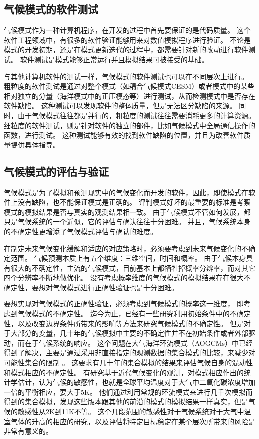 \subsection{气候模式的软件测试}
\label{related:softVerify}
气候模式作为一种计算机程序，在开发的过程中首先要保证的是代码质量。
这个软件工程领域中，有很多的软件验证能够用来对数值模拟程序进行验证\cite{whitner1989guidelines}。
不论是模式的开发初期，还是在模式更新迭代的过程中，都需要针对新的改动进行软件测试。
软件测试是模式能够正常运行并且模拟结果可被接受的基础\cite{oreskes1994verification,clune2011,easterbrook2011}。


与其他计算机软件的测试一样，气候模式的软件测试也可以在不同层次上进行。 
粗粒度的软件测试是通过对整个模式（如耦合气候模式CESM）或者模式中的某些相对独立的分量（海洋模式中的正压模态等）进行测试，从而检测模式中是否存在软件缺陷。
这种测试可以发现软件的整体质量，但是无法区分缺陷的来源。
同时，由于气候模式往往都是并行的，粗粒度的测试往往需要消耗更多的计算资源\cite{clune2011}。
细粒度的软件测试，则是针对软件的独立的部件，比如气候模式中全局通信操作的函数，进行测试。
这种测试能够有效的找到软件缺陷的位置，并且为改善软件质量提供具体指导。



\subsection{气候模式的评估与验证}
\label{related:climateValidation}

气候模式是为了模拟和预测现实中的气候变化而开发的软件，因此，即使模式在软件上没有缺陷，也不能保证模式是正确的。 
评判模式好坏的最重要的标准是考察模式的模拟结果是否与真实的观测结果相一致。
由于气候模式不管如何发展，都只是气候系统的一个近似，它的评估与确认往往十分困难\cite{martis2006validation}。
并且，气候系统本身的不确定性更增添了气候模式评估与确认的难度。 

在制定未来气候变化缓解和适应的对应策略时，必须要考虑到未来气候变化的不确定范围。
气候预测本质上有五个维度：三维空间，时间和概率。 
由于气候本身具有很大的不确定性，主流的气候模式，目前基本上都牺牲掉概率分辨率，而对其它四个分辨率不断地做优化。
没有考虑概率维度的气候模式的模拟结果存在很大不确定性，要想对气候模式进行正确性验证也是十分困难\cite{whitner1989guidelines}。


要想实现对气候模式的正确性验证，必须考虑到气候模式的概率这一维度， 即考虑到气候模式的不确定性。 
迄今为止，已经有一些研究利用初始条件中的不确定性，以及改变边界条件所带来的影响等方法来研究气候模式的不确定性。
但是对于大部分的变量，几十年的气候模拟中主要的不确定性并不在初始条件或者外部驱动，而在于气候系统的响应。
这个问题在大气海洋环流模式（AOGCMs）中已经得到了解决，主要是通过采用非直接指定的观测数据的集合模式的比较，来减少对可能性集合的限制\cite{allen2002towards} 。 
这要求有几十年的集合模拟的结果来评估气候自身的混动性和模式相应的不确定性。 
有研究基于近代气候变化的观测，对模式相应作出的统计学估计，认为气候的敏感性，也就是全球平均温度对于大气中二氧化碳浓度增加一倍的平衡相应，要大于5K\cite{stainforth2005uncertainty}。
他们通过利用常规的环流模式来进行几千次模拟而得到的集合模拟，发现这些版本跟其他的前沿的模式的模拟结果一样真实，但是气候的敏感性从2K到11K不等。
这个几段范围的敏感性对于气候系统对于大气中温室气体的升高的相应的研究，以及评估将特定目标稳定在某个层次所带来的风险是非常有意义的。



